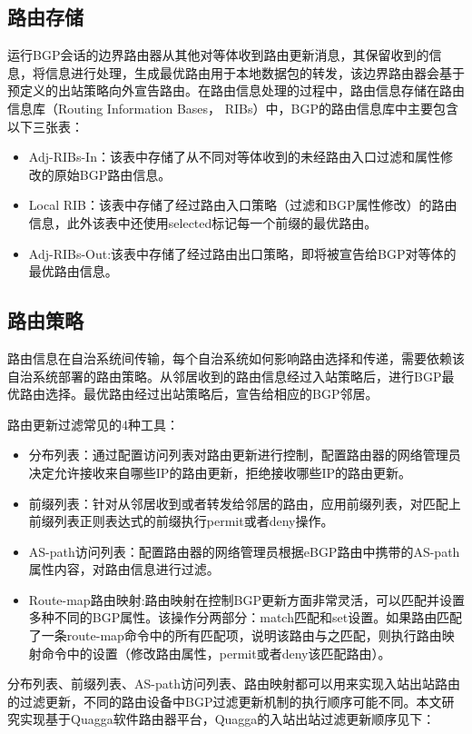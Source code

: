 \subsection{路由存储}
运行BGP会话的边界路由器从其他对等体收到路由更新消息，其保留收到的信息，将信息进行处理，生成最优路由用于本地数据包的转发，该边界路由器会基于预定义的出站策略向外宣告路由。在路由信息处理的过程中，路由信息存储在路由信息库（Routing Information Bases， RIBs）中，BGP的路由信息库\cite{rfc1771}中主要包含以下三张表：

\begin{itemize}
    \item Adj-RIBs-In：该表中存储了从不同对等体收到的未经路由入口过滤和属性修改的原始BGP路由信息。
    \item Local RIB：该表中存储了经过路由入口策略（过滤和BGP属性修改）的路由信息，此外该表中还使用selected标记每一个前缀的最优路由。
    \item Adj-RIBs-Out:该表中存储了经过路由出口策略，即将被宣告给BGP对等体的最优路由信息。
\end{itemize}

\subsection{路由策略}
路由信息在自治系统间传输，每个自治系统如何影响路由选择和传递，需要依赖该自治系统部署的路由策略\cite{DianeTeare2016CCNP}。从邻居收到的路由信息经过入站策略后，进行BGP最优路由选择。最优路由经过出站策略后，宣告给相应的BGP邻居。

路由更新过滤常见的4种工具\cite{Kocharians2015CCIE}：
\begin{itemize}
    \item 分布列表：通过配置访问列表对路由更新进行控制，配置路由器的网络管理员决定允许接收来自哪些IP的路由更新，拒绝接收哪些IP的路由更新。
    \item 前缀列表：针对从邻居收到或者转发给邻居的路由，应用前缀列表，对匹配上前缀列表正则表达式的前缀执行permit或者deny操作。
    \item AS-path访问列表：配置路由器的网络管理员根据eBGP路由中携带的AS-path属性内容，对路由信息进行过滤。
    \item Route-map路由映射:路由映射在控制BGP更新方面非常灵活，可以匹配并设置多种不同的BGP属性。该操作分两部分：match匹配和set设置。如果路由匹配了一条route-map命令中的所有匹配项，说明该路由与之匹配，则执行路由映射命令中的设置（修改路由属性，permit或者deny该匹配路由）。
\end{itemize}


分布列表、前缀列表、AS-path访问列表、路由映射都可以用来实现入站出站路由的过滤更新，不同的路由设备中BGP过滤更新机制的执行顺序可能不同。本文研究实现基于Quagga\cite{quagga}软件路由器平台，Quagga的入站出站过滤更新顺序见下：

